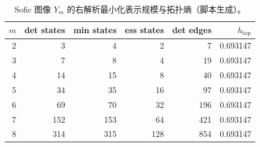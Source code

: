 \begin{table}[H]
\centering
\scriptsize
\setlength{\tabcolsep}{4pt}
\caption{Sofic 图像 $Y_m$ 的右解析最小化表示规模与拓扑熵（脚本生成）。}
\label{tab:phi_m_sofic_entropy}
\begin{tabular}{rrrrrr}
\toprule
$m$ & det states & min states & ess states & det edges & $h_{\mathrm{top}}$\\
\midrule
2 & 3 & 4 & 2 & 7 & 0.693147\\
3 & 7 & 8 & 4 & 19 & 0.693147\\
4 & 14 & 15 & 8 & 40 & 0.693147\\
5 & 34 & 35 & 16 & 97 & 0.693147\\
6 & 69 & 70 & 32 & 196 & 0.693147\\
7 & 152 & 153 & 64 & 421 & 0.693147\\
8 & 314 & 315 & 128 & 854 & 0.693147\\
\bottomrule
\end{tabular}
\end{table}
